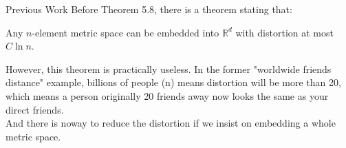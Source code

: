 \documentclass[xcolor=dvipsnames]{beamer}
\theoremstyle{remark}
\begin{document}
\begin{frame}{Previous Work}
  \hspace*{1em}Before Theorem 5.8, there is a theorem stating that:
  \begin{theorem}
    Any $n$-element metric space can be embedded into $\mathbb{R}^d$ with distortion at most $C \ln n$.\\

  \end{theorem} 
    \hspace*{1em}However, this theorem is practically useless. In the former "worldwide friends distance" example, billions of people (n) means distortion will be more than 20, which means a person originally 20 friends away now looks the same as your direct friends.\\
  \hspace*{1em}And there is noway to reduce the distortion if we insist on embedding a whole metric space.\\

\end{frame}
\end{document}
